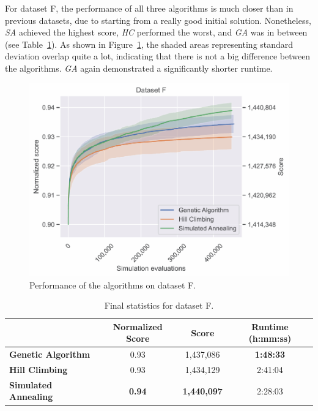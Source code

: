 For dataset F, the performance of all three algorithms is much closer than in previous datasets, due to starting from a really good initial solution. Nonetheless, \textit{SA} achieved the highest score, \textit{HC} performed the worst, and \textit{GA} was in between (see Table~\ref{tab:dataset_f_results}). As shown in Figure~\ref{fig:dataset_f_experiment}, the shaded areas representing standard deviation overlap quite a lot, indicating that there is not a big difference between the algorithms. \textit{GA} again demonstrated a significantly shorter runtime.

\bigskip

\begin{figure}[h]
    \centering
    \includegraphics[width=\linewidth]{img/experiments/pdfa-f_Genetic Algorithm_Hill Climbing_Simulated Annealing.pdf}
    \caption[Performance of the algorithms on dataset F]{
        Performance of the algorithms on dataset F.
    }
    \label{fig:dataset_f_experiment}
\end{figure}

\bigskip

\begin{table}[h]
\centering\footnotesize\sf
\begin{tabular}{lccc}
\toprule
& Normalized Score & Score & Runtime (h:mm:ss) \\
\midrule
\textcolor{myblue}{\textbf{Genetic Algorithm}} & 0.93 & 1,437,086 & \textbf{1:48:33} \\
\textcolor{myorange}{\textbf{Hill Climbing}} & 0.93 & 1,434,129 & 2:41:04 \\
\textcolor{mygreen}{\textbf{Simulated Annealing}} & \textbf{0.94} & \textbf{1,440,097} & 2:28:03 \\
\bottomrule
\end{tabular}
\caption[Statistics for dataset F]{
    Final statistics for dataset F.
}
\label{tab:dataset_f_results}
\end{table}

